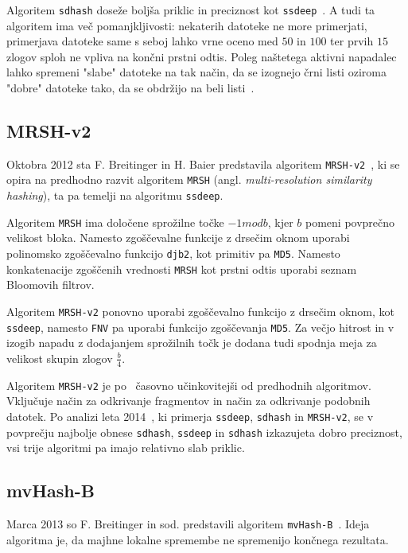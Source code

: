 \documentclass{acm_proc_article-sp}
\begin{document}
Algoritem \texttt{sdhash} doseže boljša priklic in preciznost kot \texttt{ssdeep}~\cite{fbhash}. A tudi ta algoritem ima več pomanjkljivosti: nekaterih datoteke ne more primerjati, primerjava datoteke same s seboj lahko vrne oceno med $50$ in $100$ ter prvih $15$ zlogov sploh ne vpliva na končni prstni odtis. Poleg naštetega aktivni napadalec lahko spremeni "slabe" datoteke na tak način, da se izognejo črni listi oziroma "dobre" datoteke tako, da se obdržijo na beli listi~\cite{breitinge2012security}.

\subsection{MRSH-v2}
Oktobra 2012 sta F. Breitinger in H. Baier predstavila algoritem \texttt{MRSH-v2}~\cite{mrsh-v2}, ki se opira na predhodno razvit algoritem \texttt{MRSH} (angl. \emph{multi-resolution similarity hashing}), ta pa temelji na algoritmu \texttt{ssdeep}. 

Algoritem \texttt{MRSH} ima določene sprožilne točke $-1 mod b$, kjer $b$ pomeni povprečno velikost bloka. Namesto zgoščevalne funkcije z drsečim oknom uporabi polinomsko zgoščevalno funkcijo \texttt{djb2}, kot primitiv pa \texttt{MD5}. Namesto konkatenacije zgoščenih vrednosti \texttt{MRSH} kot prstni odtis uporabi seznam Bloomovih filtrov. 

Algoritem \texttt{MRSH-v2} ponovno uporabi zgoščevalno funkcijo z drsečim oknom, kot \texttt{ssdeep}, namesto \texttt{FNV} pa uporabi funkcijo zgoščevanja \texttt{MD5}. Za večjo hitrost in v izogib napadu z dodajanjem sprožilnih točk je dodana tudi spodnja meja za velikost skupin zlogov $\frac{b}{4}$. 

Algoritem \texttt{MRSH-v2} je po~\cite{mrsh-v2} časovno učinkovitejši od predhodnih algoritmov. Vključuje način za odkrivanje fragmentov in način za odkrivanje podobnih datotek. Po analizi leta 2014~\cite{breitinger2014}, ki primerja \texttt{ssdeep}, \texttt{sdhash} in \texttt{MRSH-v2}, se v povprečju najbolje obnese \texttt{sdhash}, \texttt{ssdeep} in \texttt{sdhash} izkazujeta dobro preciznost, vsi trije algoritmi pa imajo relativno slab priklic.

\subsection{mvHash-B}
Marca 2013 so F. Breitinger in sod. predstavili algoritem \texttt{mvHash-B}~\cite{mvhash-b}. Ideja algoritma je, da majhne lokalne spremembe ne spremenijo končnega rezultata. 
\end{document}
